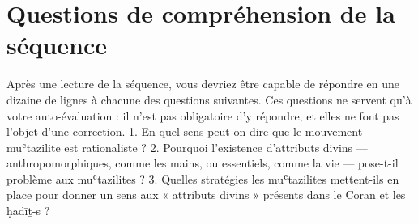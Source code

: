 \section{Questions de compréhension de la séquence}
     Après une lecture de la séquence, vous devriez être capable de répondre en une dizaine de lignes à chacune des questions suivantes. Ces questions ne servent qu’à votre auto-évaluation : il n’est pas obligatoire d’y répondre, et elles ne font pas l’objet d’une correction.  1. En quel sens peut-on dire que le mouvement muʿtazilite est rationaliste ?  2. Pourquoi l’existence d’attributs divins — anthropomorphiques, comme les mains, ou essentiels, comme la vie — pose-t-il problème aux muʿtazilites ?  3. Quelles stratégies les muʿtazilites mettent-ils en place pour donner un sens aux « attributs divins » présents dans le Coran et les ḥadīṯ-s ? 